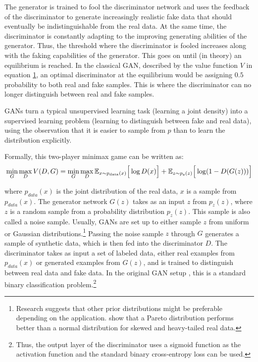 The generator is trained to fool the discriminator network and uses the feedback of the discriminator to generate increasingly realistic fake data that should eventually be indistinguishable from the real data. At the same time, the discriminator is constantly adapting to the improving generating abilities of the generator. Thus, the threshold where the discriminator is fooled increases along with the faking capabilities of the generator. This goes on until (in theory) an equilibrium is reached. In the classical GAN, described by the value function \(V\) in equation \hyperref[eq:originalGAN]{1}, an optimal discriminator at the equilibrium would be assigning \(0.5\) probability to both real and fake samples. This is where the discriminator can no longer distinguish between real and fake samples.

GANs turn a typical unsupervised learning task (learning a joint
density) into a supervised learning problem (learning to distinguish
between fake and real data), using the observation that it is easier to
sample from \(p\) than to learn the distribution explicitly.

Formally, this two-player minimax game can be written as:
\begin{equation}\label{eq:originalGAN}
\min_{G} \max_{D} V(D,G) = \min_{G} \max_{D} \mathbb{E}_{x \sim p_{\rm data}(x)}\Big[ \log D(x)\Big] + \mathbb{E}_{z \sim p_{\rm z}(z)}\Big[\log (1-D(G(z)))\Big]
\end{equation}

where \(p_{data}(x)\) is the joint distribution of the real data, \(x\) is a sample from \(p_{data}(x)\). The generator network \(G(z)\) takes as an input \(z\) from \(p_z(z)\), where \(z\) is a random sample from a probability distribution \(p_z(z)\). This sample is also called a noise sample. Usually, GANs are set up to either sample \(z\) from uniform or Gaussian distributions.\footnote{Research suggests that other
  prior distributions might be preferable depending on the application. \citet{huster21a} show that a Pareto distribution performs
  better than a normal distribution for skewed and heavy-tailed real data.} Passing the noise sample \(z\) through \(G\) generates a sample of synthetic data, which is then fed into the discriminator \(D\). The discriminator takes as input a set of labeled data, either real examples from \(p_{data}(x)\) or generated examples from \(G(z)\), and is trained to distinguish between real data and fake data. In the original GAN setup \citep{Goodfellow2014}, this is a standard binary classification problem.\footnote{Thus, the output layer of the discriminator uses a sigmoid
  function as the activation function and the standard binary
  cross-entropy loss can be used.}

